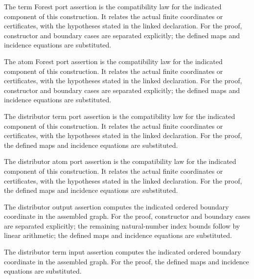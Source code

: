 The term Forest port assertion is the compatibility law for the indicated component of this construction. It relates the actual finite coordinates or certificates, with the hypotheses stated in the linked declaration.
For the proof, constructor and boundary cases are separated explicitly; the defined maps and incidence equations are substituted.
\par{}

The atom Forest port assertion is the compatibility law for the indicated component of this construction. It relates the actual finite coordinates or certificates, with the hypotheses stated in the linked declaration.
For the proof, constructor and boundary cases are separated explicitly; the defined maps and incidence equations are substituted.
\par{}

The distributor term port assertion is the compatibility law for the indicated component of this construction. It relates the actual finite coordinates or certificates, with the hypotheses stated in the linked declaration.
For the proof, the defined maps and incidence equations are substituted.
\par{}

The distributor atom port assertion is the compatibility law for the indicated component of this construction. It relates the actual finite coordinates or certificates, with the hypotheses stated in the linked declaration.
For the proof, the defined maps and incidence equations are substituted.
\par{}

The distributor output assertion computes the indicated ordered boundary coordinate in the assembled graph.
For the proof, constructor and boundary cases are separated explicitly; the remaining natural-number index bounds follow by linear arithmetic; the defined maps and incidence equations are substituted.
\par{}

The distributor term input assertion computes the indicated ordered boundary coordinate in the assembled graph.
For the proof, the defined maps and incidence equations are substituted.
\par{}

